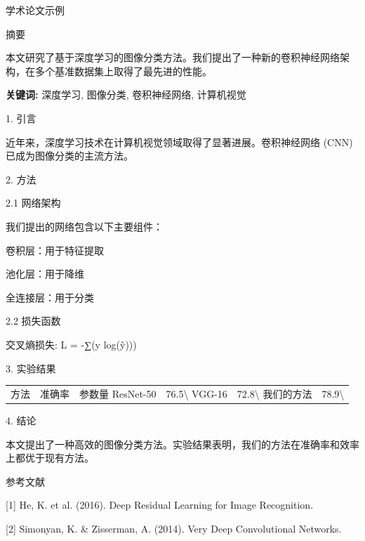 \documentclass{article}
\begin{document}
学术论文示例

摘要

本文研究了基于深度学习的图像分类方法。我们提出了一种新的卷积神经网络架构，在多个基准数据集上取得了最先进的性能。

\textbf{关键词: }深度学习, 图像分类, 卷积神经网络, 计算机视觉

1. 引言

近年来，深度学习技术在计算机视觉领域取得了显著进展。卷积神经网络 (CNN) 已成为图像分类的主流方法。

2. 方法

2.1 网络架构

我们提出的网络包含以下主要组件：

卷积层：用于特征提取

池化层：用于降维

全连接层：用于分类

2.2 损失函数

交叉熵损失: L = -∑(y log(ŷ)))

3. 实验结果

\begin{tabular}{|c|c|c|}
\hline
方法 & 准确率 & 参数量
\hline
ResNet-50 & 76.5\textbackslash{}%
\hline
VGG-16 & 72.8\textbackslash{}%
\hline
我们的方法 & 78.9\textbackslash{}%
\hline
\end{tabular}

4. 结论

本文提出了一种高效的图像分类方法。实验结果表明，我们的方法在准确率和效率上都优于现有方法。

参考文献

[1] He, K. et al. (2016). Deep Residual Learning for Image Recognition.

[2] Simonyan, K. & Zisserman, A. (2014). Very Deep Convolutional Networks.
\end{document}
